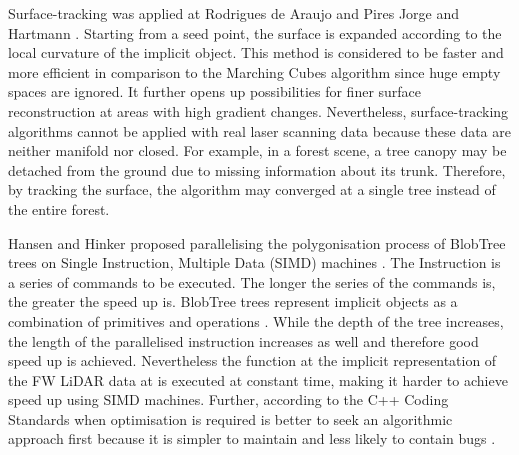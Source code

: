 \documentclass{subfiles}
\begin{document}
\par Surface-tracking was applied at Rodrigues de Araujo and Pires Jorge \cite{Rodrigues2005} and Hartmann \cite{Hartmann1998}. Starting from a seed point, the surface is expanded according to the local curvature of the implicit object. This method is considered to be faster and more efficient in comparison to the Marching Cubes algorithm since huge empty spaces are ignored. It further opens up possibilities for finer surface reconstruction at areas with high {\color{red}gradient} changes. Nevertheless, surface-tracking algorithms cannot be applied with real laser scanning data because these data are neither manifold nor closed. For example, in a forest scene, a tree canopy may be detached from the ground due to missing information about its trunk. Therefore, by tracking the surface, the algorithm may converged at a single tree instead of the entire forest.  

\par Hansen and Hinker proposed parallelising the polygonisation process of BlobTree trees on Single Instruction, Multiple Data (SIMD) machines \cite{Hansen1992}. {\color{blue}The Instruction is a series of commands to be executed. The longer the series of the commands is, the greater the speed up is. BlobTree trees represent implicit objects as a combination of primitives and operations \cite{Galbraith2004}. While the depth of the tree increases, the length of the parallelised instruction increases as well and therefore good speed up is achieved}. Nevertheless the function at the implicit representation of the FW LiDAR data at \cite{Miltiadou2014} is executed at constant time, making it harder to achieve speed up using SIMD machines. Further, according to the C++ Coding Standards when optimisation is required is better to seek an algorithmic approach first because it is simpler to maintain and less likely to contain bugs \cite{Sutter2004}. 
\end{document}
